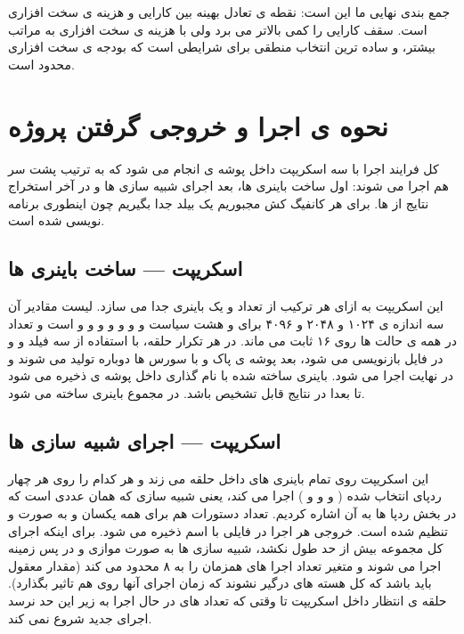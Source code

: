 \documentclass[12pt,a4paper]{article}
\begin{document}
جمع بندی نهایی ما این است:  نقطه ی تعادل بهینه بین کارایی و هزینه ی سخت افزاری است.  سقف کارایی را کمی بالاتر می برد ولی با هزینه ی سخت افزاری به مراتب بیشتر، و  ساده ترین انتخاب منطقی برای شرایطی است که بودجه ی سخت افزاری محدود است.

\newpage
\section{نحوه ی اجرا و خروجی گرفتن پروژه}

کل فرایند اجرا با سه اسکریپت داخل پوشه ی  انجام می شود که به ترتیب پشت سر هم اجرا می شوند: اول ساخت باینری ها، بعد اجرای شبیه سازی ها و در آخر استخراج نتایج از  ها. برای هر کانفیگ کش مجبوریم یک بیلد جدا بگیریم چون  اینطوری برنامه نویسی شده است.

\subsection{اسکریپت  — ساخت باینری ها}

این اسکریپت به ازای هر ترکیب از تعداد  و  یک باینری جدا می سازد. لیست مقادیر آن سه اندازه ی ۱۰۲۴ و ۲۰۴۸ و ۴۰۹۶ برای  و هشت سیاست  و  و  و  و  و  و  و  است و تعداد  در همه ی حالت ها روی ۱۶ ثابت می ماند. در هر تکرار حلقه، با استفاده از  سه فیلد  و  و  در فایل  بازنویسی می شود، بعد پوشه ی  پاک و با  سورس ها دوباره تولید می شوند و در نهایت  اجرا می شود. باینری ساخته شده با نام گذاری  داخل پوشه ی  ذخیره می شود تا بعدا در نتایج قابل تشخیص باشد. در مجموع  باینری ساخته می شود.

\subsection{اسکریپت  — اجرای شبیه سازی ها}

این اسکریپت روی تمام باینری های داخل  حلقه می زند و هر کدام را روی هر چهار ردپای انتخاب شده ( و  و  و ) اجرا می کند، یعنی  شبیه سازی که همان عددی است که در بخش ردپا ها به آن اشاره کردیم. تعداد دستورات هم برای همه یکسان و به صورت  و  تنظیم شده است. خروجی هر اجرا در فایلی با اسم  ذخیره می شود. برای اینکه اجرای کل مجموعه بیش از حد طول نکشد، شبیه سازی ها به صورت موازی و در پس زمینه اجرا می شوند و متغیر  تعداد اجرا های همزمان را به ۸ محدود می کند (مقدار معقول باید باشد که کل هسته های  درگیر نشوند که زمان اجرای آنها روی هم تاثیر بگذارد). حلقه ی انتظار داخل اسکریپت تا وقتی که تعداد  های در حال اجرا به زیر این حد نرسد اجرای جدید شروع نمی کند.
\end{document}
